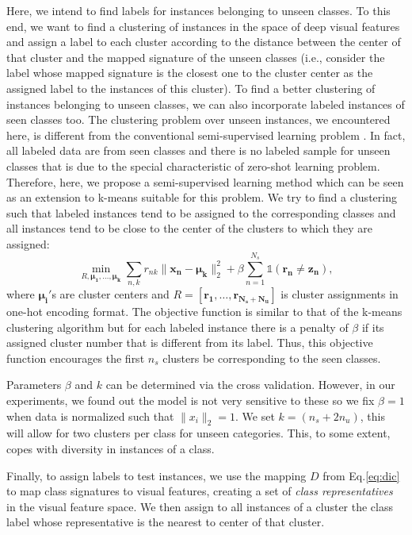 \documentclass[letterpaper]{article}
\DeclareMathOperator*{\minimize}{min}
\begin{document}
Here, we intend to find labels for instances belonging to unseen classes. To this end, we want to find a clustering of instances
 in the space of deep visual features and assign a label to each cluster according to the distance between the center of that cluster
 and the mapped signature of the unseen classes
(i.e., consider the label whose mapped signature is the closest one to the cluster center as the assigned label to the instances of this cluster).
To find a better clustering of instances belonging to unseen classes,
 we can also incorporate labeled instances of seen classes too.
  The clustering problem over unseen instances, we encountered here, is different from the conventional semi-supervised learning problem \cite{chapel06}.
In fact, all labeled data are from seen classes and there is no labeled sample for unseen classes that is due to the special characteristic of zero-shot learning problem. Therefore, here, we propose a semi-supervised learning method which
can be seen as an extension to k-means suitable for this problem.
 We try to find a clustering such that labeled instances tend to be assigned to the corresponding classes and all instances tend to be close to the center of the clusters to which they are assigned:
\begin{equation} \label{eq:simple}
\minimize_{R, \mathbf{\mu_1, \ldots, \mu_k }}  \sum_{n,k} r_{nk} \lVert \mathbf{x_n - \mu_k} \rVert_2^2 +
 \beta \sum_{n=1}^{N_s} \mathds{1}(\mathbf{r_n \neq z_n}),
\end{equation}
where $\mathbf{\mu_i'}$s are cluster centers and $R = [\mathbf{r_1, \ldots, r_{N_s + N_u }} ]$ is cluster assignments in one-hot encoding format.
The objective function is similar to that of the k-means clustering algorithm but for each labeled instance there is a penalty of $\beta$ if its assigned cluster number that is different from its label. Thus, this objective function encourages
the first $n_s$ clusters be corresponding to the seen classes.

Parameters $\beta$ and $k$ can be determined via the cross validation. However, in our experiments, we found out
the model is not very sensitive to these so we fix $\beta=1$
when data is normalized such that $\lVert x_i \rVert_2 = 1$. We set $k =  (n_s + 2n_u)$, this
will allow for two clusters per class for unseen categories. This, to some extent, copes with diversity in instances of a class.


Finally, to assign labels to test instances, we use the mapping $D$ from Eq.\eqref{eq:dic} to
map class signatures to visual features, creating a set of \textit{class representatives}
 in the visual feature space. We then assign to all instances of a cluster the class label whose representative is
  the nearest to center of that cluster.
\end{document}
